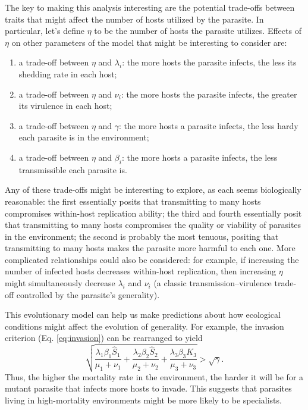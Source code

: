 \documentclass[11pt,reqno,final,pdftex]{amsart}\usepackage[]{graphicx}\usepackage[]{color}
\theoremstyle{plain}
\numberwithin{equation}{part}
\begin{document}
The key to making this analysis interesting are the potential trade-offs between traits that might affect the number of hosts utilized by the parasite.
In particular, let's define $\eta$ to be the number of hosts the parasite utilizes.
Effects of $\eta$ on other parameters of the model that might be interesting to consider are:
\begin{enumerate}
\item a trade-off between $\eta$ and $\lambda_i$: the more hosts the parasite infects, the less its shedding rate in each host;
\item a trade-off between $\eta$ and $\nu_i$: the more hosts the parasite infects, the greater its virulence in each host;
\item a trade-off between $\eta$ and $\gamma$: the more hosts a parasite infects, the less hardy each parasite is in the environment;
\item a trade-off between $\eta$ and $\beta_i$: the more hosts a parasite infects, the less transmissible each parasite is.
\end{enumerate}
Any of these trade-offs might be interesting to explore, as each seems biologically reasonable: the first essentially posits that transmitting to many hosts compromises within-host replication ability; the third and fourth essentially posit that transmitting to many hosts compromises the quality or viability of parasites in the environment; the second is probably the most tenuous, positing that transmitting to many hosts makes the parasite more harmful to each one.
More complicated relationships could also be considered: for example, if increasing the number of infected hosts decreases within-host replication, then increasing $\eta$ might simultaneously decrease $\lambda_i$ and $\nu_i$ (a classic transmission--virulence trade-off controlled by the parasite's generality).

This evolutionary model can help us make predictions about how ecological conditions might affect the evolution of generality.
For example, the invasion criterion (Eq. \ref{eq:invasion}) can be rearranged to yield
\begin{equation}
\sqrt{\frac{\lambda_1 \beta_1 \hat{S}_1}{\mu_1 + \nu_1} + \frac{\lambda_2 \beta_2 \hat{S}_2}{\mu_2 + \nu_2} + \frac{\lambda_3 \beta_3 K_3}{\mu_3 + \nu_3}} > \sqrt{\gamma}.
\end{equation}
Thus, the higher the mortality rate in the environment, the harder it will be for a mutant parasite that infects more hosts to invade.
This suggests that parasites living in high-mortality environments might be more likely to be specialists.
\end{document}
